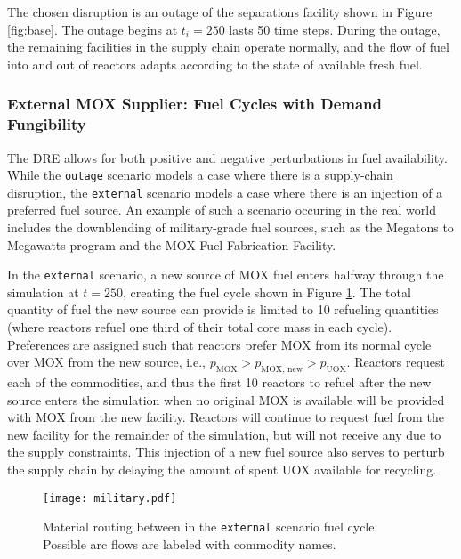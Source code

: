 The chosen disruption is an outage of the separations facility shown in Figure
\ref{fig:base}. The outage begins at $t_i = 250$ lasts 50 time steps. During the
outage, the remaining facilities in the supply chain operate normally, and the
flow of fuel into and out of reactors adapts according to the state of available
fresh fuel. 

\subsubsection{External MOX Supplier: Fuel Cycles with Demand Fungibility}

The DRE allows for both positive and negative perturbations in fuel
availability. While the \texttt{outage} scenario models a case where there is a
supply-chain disruption, the \texttt{external} scenario models a case where
there is an injection of a preferred fuel source. An example of such a scenario
occuring in the real world includes the downblending of military-grade fuel
sources, such as the Megatons to Megawatts program and the MOX Fuel Fabrication
Facility.

In the \texttt{external} scenario, a new source of MOX fuel enters halfway
through the simulation at $t = 250$, creating the fuel cycle shown in Figure
\ref{fig:military}. The total quantity of fuel the new source can provide is
limited to 10 refueling quantities (where reactors refuel one third of their
total core mass in each cycle). Preferences are assigned such that reactors
prefer MOX from its normal cycle over MOX from the new source, i.e.,
$p_{\text{MOX}} > p_{\text{MOX, new}} > p_{\text{UOX}}$. Reactors request each
of the commodities, and thus the first 10 reactors to refuel after the new
source enters the simulation when no original MOX is available will be provided
with MOX from the new facility. Reactors will continue to request fuel from the
new facility for the remainder of the simulation, but will not receive any due
to the supply constraints. This injection of a new fuel source also serves to
perturb the supply chain by delaying the amount of spent UOX available for
recycling.

\begin{figure}
  \begin{center}
    \texttt{[image: military.pdf]}
    \caption[]{
      \label{fig:military}
      Material routing between in the \texttt{external} scenario fuel
      cycle. Possible arc flows are labeled with commodity names.}
  \end{center}
\end{figure}


